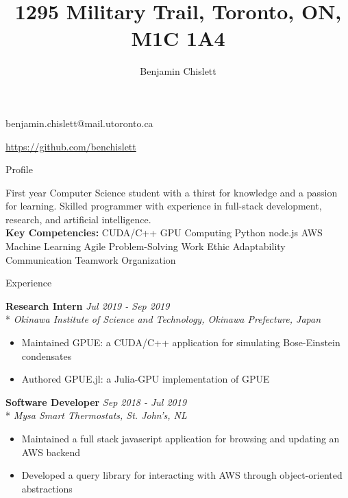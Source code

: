 \documentclass[11pt, letterpaper]{article}
\title{1295 Military Trail, Toronto, ON, M1C 1A4}
\author{Benjamin Chislett}
\date{}
\newcommand{\vbar}{\textbar\xspace}
\begin{document}
\begin{center}
  \Huge\theauthor
  \par
  \large\thetitle
  \par
  \large{benjamin.chislett@mail.utoronto.ca}
  \par
  \large\url{https://github.com/benchislett}
\end{center}

\begin{section}{Profile}

First year Computer Science student with a thirst for knowledge and a passion for learning.
Skilled programmer with experience in full-stack development, research, and artificial intelligence.
\\

\textbf{Key Competencies:} CUDA/C++ \vbar GPU Computing \vbar Python \vbar node.js \vbar AWS \vbar Machine Learning  Agile \vbar Problem-Solving \vbar Work Ethic \vbar Adaptability \vbar Communication \vbar Teamwork \vbar Organization

\end{section}

\begin{section}{Experience}

\textbf{Research Intern}
\hfill
\textit{Jul 2019 - Sep 2019}\\*
\textit{Okinawa Institute of Science and Technology, Okinawa Prefecture, Japan}

\begin{itemize}
  \item Maintained GPUE: a CUDA/C++ application for simulating Bose-Einstein condensates
  \item Authored GPUE.jl: a Julia-GPU implementation of GPUE\\
\end{itemize}

\textbf{Software Developer}
\hfill
\textit{Sep 2018 - Jul 2019}\\*
\textit{Mysa Smart Thermostats, St. John's, NL}
\begin{itemize}
  \item Maintained a full stack javascript application for browsing and updating an AWS backend
  \item Developed a query library for interacting with AWS through object-oriented abstractions
\end{itemize}

\end{section}
\end{document}
